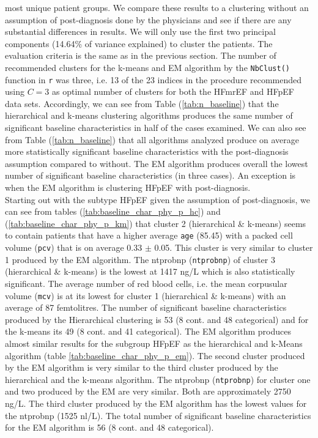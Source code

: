 \documentclass[../thesis.tex]{subfiles}
\begin{document}
\noindent most unique patient groups. We compare these results to a clustering without an assumption of post-diagnosis done by the physicians and see if there are any substantial differences in results. We will only use the first two principal components (14.64\% of variance explained) to cluster the patients. The evaluation criteria is the same as in the previous section. The number of recommended clusters for the k-means and EM algorithm by the \texttt{NbClust()} \citep{nbclust} function in \texttt{r} was three, i.e. 13 of the 23 indices in the procedure recommended using $C = 3$ as optimal number of clusters for both the HFmrEF and HFpEF data sets. Accordingly, we can see from Table (\ref{tab:n_baseline}) that the hierarchical and k-means clustering algorithms produces the same number of significant baseline characteristics in half of the cases examined.  We can also see from Table (\ref{tab:n_baseline}) that all algorithms analyzed produce on average more statistically significant baseline characteristics with the post-diagnosis assumption compared to without. The EM algorithm produces overall the lowest number of significant baseline characteristics (in three cases). An exception is when the EM algorithm is clustering HFpEF with post-diagnosis.\\ 
\indent Starting out with the subtype HFpEF given the assumption of post-diagnosis, we can see from tables (\ref{tab:baseline_char_phy_p_hc}) and (\ref{tab:baseline_char_phy_p_km}) that cluster 2 (hierarchical \& k-means) seems to contain patients that have a higher average \texttt{age} (85.45) with a packed cell volume (\texttt{pcv}) that is on average 0.33 $\pm$ 0.05. This cluster is very similar to cluster 1 produced by the EM algorithm. The ntprobnp (\texttt{ntprobnp}) of cluster 3 (hierarchical \& k-means) is the lowest at 1417 ng/L which is also statistically significant. The average number of red blood cells, i.e. the mean corpusular volume (\texttt{mcv}) is at its lowest for cluster 1 (hierarchical \& k-means) with an average of 87 femtolitres. The number of significant baseline characteristics produced by the Hierarchical clustering is 53 (8 cont. and 48 categorical) and for the k-means its 49 (8 cont. and 41 categorical). The EM algorithm produces almost similar results for the subgroup HFpEF as the hierarchical and k-Means algorithm (table \ref{tab:baseline_char_phy_p_em}). The second cluster produced by the EM algorithm is very similar to the third cluster produced by the hierarchical and the k-means algorithm. The ntprobnp (\texttt{ntprobnp}) for cluster one and two produced by the EM are very similar. Both are approximately 2750 ng/L. The third cluster produced by the EM algorithm has the lowest values for the ntprobnp (1525 nl/L). The total number of significant baseline characteristics for the EM algorithm is 56 (8 cont. and 48 categorical). \\ 
\end{document}
